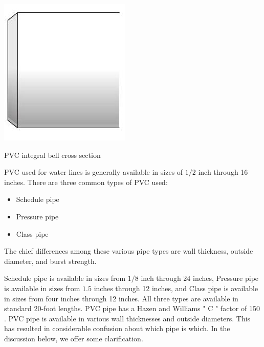 \documentclass[10pt]{article}
\begin{document}
\includegraphics[max width=\textwidth]{PVCIntegralBellSpigotJoint2}

PVC integral bell cross section

PVC used for water lines is generally available in sizes of $1 / 2$ inch through 16 inches. There are three common types of PVC used:

\begin{itemize}
  \item Schedule pipe

  \item Pressure pipe

  \item Class pipe

\end{itemize}
The chief differences among these various pipe types are wall thickness, outside diameter, and burst strength.

Schedule pipe is available in sizes from $1 / 8$ inch through 24 inches, Pressure pipe is available in sizes from $1.5$ inches through 12 inches, and Class pipe is available in sizes from four inches through 12 inches. All three types are available in standard 20-foot lengths. PVC pipe has a Hazen and Williams " $\mathrm{C}$ " factor of 150 . PVC pipe is available in various wall thicknesses and outside diameters. This has resulted in considerable confusion about which pipe is which. In the discussion below, we offer some clarification.
\end{document}

